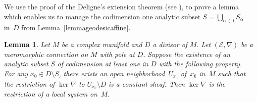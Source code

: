 \documentclass[pdftex]{sigma}
\numberwithin{equation}{section}
\newtheorem{Lemma}[Theorem]{Lemma}
\begin{document}
We use the proof of the Deligne's extension theorem (see \cite[Chapter~II, Theorems~5.2 and~5.4]{Deligne}), to prove a lemma which enables us to manage the codimension one analytic subset $S=\bigcup_{\alpha\in I} S_\alpha$ in~$D$ from Lemma~\ref{lemmageodesicaffine}.

\begin{Lemma}\label{lemmalocalmonodromy} Let $M$ be a complex manifold and $D$ a divisor of $M$. Let $(\mathcal{E},\nabla)$ be a meromorphic connection on $M$ with pole at $D$.
Suppose the existence of an analytic subset $S$ of codimension at least one in $D$ with the following property. For any $x_0\in D\setminus S$, there exists an open neighborhood~$U_{x_0}$ of~$x_0$ in~$M$ such that the restriction of $\ker  \nabla$ to $U_{x_0}\setminus D$ is a constant sheaf.
Then $\ker  \nabla$ is the restriction of a local system on~$M$.
\end{Lemma}
\end{document}
